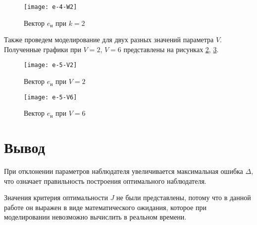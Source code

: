 \documentclass[14pt, a4paper]{extarticle}
\begin{document}
	\begin{figure}[H]
		\centering
		\texttt{[image: e-4-W2]}
		\caption{Вектор $e_\text{н}$ при $k=2$}
		\label{fig:e-4-W2}
	\end{figure}
	
	Также проведем моделирование для двух разных значений параметра $V$. Полученные графики при $V=2$, $V=6$ представлены на рисунках \ref{fig:e-5-V2}, \ref{fig:e-5-V6}.
	
	\begin{figure}[H]
		\centering
		\texttt{[image: e-5-V2]}
		\caption{Вектор $e_\text{н}$ при $V=2$}
		\label{fig:e-5-V2}
	\end{figure}
	
	\begin{figure}[H]
		\centering
		\texttt{[image: e-5-V6]}
		\caption{Вектор $e_\text{н}$ при $V=6$}
		\label{fig:e-5-V6}
	\end{figure}
	
	\newpage
	
	\section*{Вывод}
	
	При отклонении параметров наблюдателя увеличивается максимальная ошибка $\Delta$, что означает правильность построения оптимального наблюдателя.
	
	
	Значения критерия оптимальности $J$ не были представлены, потому что в данной работе он выражен в виде математического ожидания, которое при моделировании невозможно вычислить в реальном времени.
\end{document}
